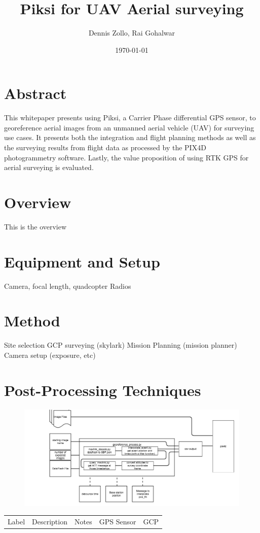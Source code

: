 \documentclass{article}
\title{Piksi for UAV Aerial surveying}
\author{Dennis Zollo, Rai Gohalwar}
\date{\today}
\begin{document}
\maketitle

\thispagestyle{firstpage}

\section{Abstract}
\label{sec:abstract}
This whitepaper presents using Piksi, a Carrier Phase differential GPS sensor, to georeference aerial images from an unmanned aerial vehicle (UAV) for surveying use cases.
It presents both the integration and flight planning methods as well as the surveying  results from flight data as processed by the PIX4D photogrammetry software.
Lastly, the value proposition of using RTK GPS for aerial surveying is evaluated.
\tableofcontents
\newpage
\section{Overview}
\label{sec:Overview}
This is the overview
\section{Equipment and Setup}
\label{sec:equipment}
Camera, focal length, quadcopter
Radios
\section{Method}
\label{sec:method}
Site selection
GCP surveying (skylark)
Mission Planning (mission planner)
Camera setup (exposure, etc)
\section{Post-Processing Techniques}
\begin{figure}
\begin{center}
\includegraphics[width=7in]{images/uav_survey_processing_architecture.png}
\end{center}
\end{figure}
\begin{tabular}[pos]{l|l|l|l|l}
Label & Description & Notes & GPS Sensor & GCP
\end{tabular}
\thispagestyle{lastpage}
\end{document}
